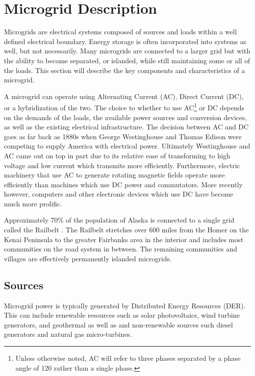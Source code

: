 \section{Microgrid Description}
Microgrids are electrical systems composed of sources and loads within a well defined electrical boundary. Energy storage is often incorporated into systems as well, but not necessarily. Many microgrids are connected to a larger grid but with the ability to become separated, or islanded, while still maintaining some or all of the loads. This section will describe the key components and characteristics of a microgrid.

A microgrid can operate using Alternating Current (AC), Direct Current (DC), or a hybridization of the two. The choice to whether to use AC\footnote{Unless otherwise noted, AC will refer to three phases separated by a phase angle of 120\textdegree{} rather than a single phase.} or DC depends on the demands of the loads, the available power sources and conversion devices, as well as the existing electrical infrastructure. The decision between AC and DC goes as far back as 1880s when George Westinghouse and Thomas Edison were competing to supply America with electrical power. Ultimately Westinghouse and AC came out on top in part due to its relative ease of transforming to high voltage and low current which transmits more efficiently. Furthermore, electric machinery that use AC to generate rotating magnetic fields operate more efficiently than machines which use DC power and commutators. More recently however, computers and other electronic devices which use DC have become much more prolific.  

Approximately 70\% of the population of Alaska is connected to a single grid called the Railbelt \cite{railbelt}. The Railbelt stretches over 600 miles from the Homer on the Kenai Peninsula to the greater Fairbanks area in the interior and includes most communities on the road system in between. The remaining communities and villages are effectively permanently islanded microgrids. 

\subsection{Sources}
Microgrid power is typically generated by Distributed Energy Resources (DER). This can include renewable resources such as solar photovoltaics, wind turbine generators, and geothermal as well as and non\--re\-new\-able sources such diesel generators and natural gas micro-turbines. 

